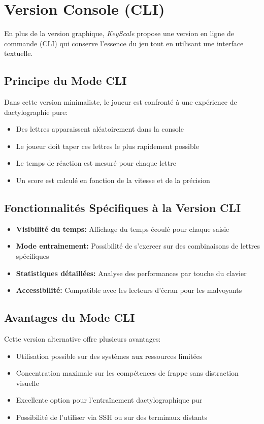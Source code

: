 \documentclass{article}
\begin{document}
\section{Version Console (CLI)}
En plus de la version graphique, \textit{KeyScale} propose une version en ligne de commande (CLI) qui conserve l'essence du jeu tout en utilisant une interface textuelle.

\subsection{Principe du Mode CLI}
Dans cette version minimaliste, le joueur est confronté à une expérience de dactylographie pure:
\begin{itemize}
    \item Des lettres apparaissent aléatoirement dans la console
    \item Le joueur doit taper ces lettres le plus rapidement possible
    \item Le temps de réaction est mesuré pour chaque lettre
    \item Un score est calculé en fonction de la vitesse et de la précision
\end{itemize}

\subsection{Fonctionnalités Spécifiques à la Version CLI}
\begin{itemize}
    \item \textbf{Visibilité du temps:} Affichage du temps écoulé pour chaque saisie
    \item \textbf{Mode entrainement:} Possibilité de s'exercer sur des combinaisons de lettres spécifiques
    \item \textbf{Statistiques détaillées:} Analyse des performances par touche du clavier
    \item \textbf{Accessibilité:} Compatible avec les lecteurs d'écran pour les malvoyants
\end{itemize}

\subsection{Avantages du Mode CLI}
Cette version alternative offre plusieurs avantages:
\begin{itemize}
    \item Utilisation possible sur des systèmes aux ressources limitées
    \item Concentration maximale sur les compétences de frappe sans distraction visuelle
    \item Excellente option pour l'entraînement dactylographique pur
    \item Possibilité de l'utiliser via SSH ou sur des terminaux distants
\end{itemize}
\end{document}
